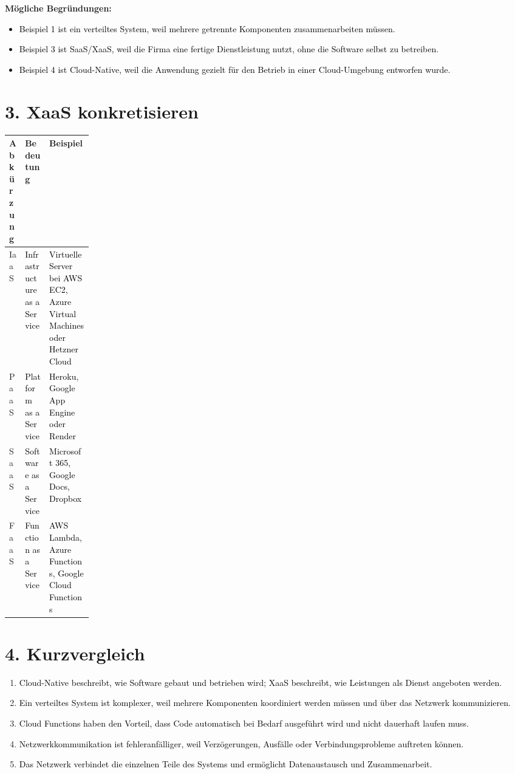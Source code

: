 \documentclass[11pt,a4paper]{article}
\newcommand{\solution}[1]{\textcolor{black}{#1}}
\begin{document}
\textbf{M\"ogliche Begr\"undungen:}
\begin{itemize}
  \item \solution{Beispiel 1 ist ein verteiltes System, weil mehrere getrennte Komponenten zusammenarbeiten m\"ussen.}
  \item \solution{Beispiel 3 ist SaaS/XaaS, weil die Firma eine fertige Dienstleistung nutzt, ohne die Software selbst zu betreiben.}
  \item \solution{Beispiel 4 ist Cloud-Native, weil die Anwendung gezielt f\"ur den Betrieb in einer Cloud-Umgebung entworfen wurde.}
\end{itemize}

\section*{3. XaaS konkretisieren}
\begin{tabularx}{\linewidth}{|>{\raggedright\arraybackslash}p{0.16\linewidth}|>{\raggedright\arraybackslash}X|>{\raggedright\arraybackslash}X|}
\hline
\textbf{Abk\"urzung} & \textbf{Bedeutung} & \textbf{Beispiel} \\
\hline
IaaS & \solution{Infrastructure as a Service} & \solution{Virtuelle Server bei AWS EC2, Azure Virtual Machines oder Hetzner Cloud} \\ \hline
PaaS & \solution{Platform as a Service} & \solution{Heroku, Google App Engine oder Render} \\ \hline
SaaS & \solution{Software as a Service} & \solution{Microsoft 365, Google Docs, Dropbox} \\ \hline
FaaS & \solution{Function as a Service} & \solution{AWS Lambda, Azure Functions, Google Cloud Functions} \\ \hline
\end{tabularx}

\section*{4. Kurzvergleich}
\begin{enumerate}
  \item \solution{Cloud-Native beschreibt, wie Software gebaut und betrieben wird; XaaS beschreibt, wie Leistungen als Dienst angeboten werden.}
  \item \solution{Ein verteiltes System ist komplexer, weil mehrere Komponenten koordiniert werden m\"ussen und \"uber das Netzwerk kommunizieren.}
  \item \solution{Cloud Functions haben den Vorteil, dass Code automatisch bei Bedarf ausgef\"uhrt wird und nicht dauerhaft laufen muss.}
  \item \solution{Netzwerkkommunikation ist fehleranf\"alliger, weil Verz\"ogerungen, Ausf\"alle oder Verbindungsprobleme auftreten k\"onnen.}
  \item \solution{Das Netzwerk verbindet die einzelnen Teile des Systems und erm\"oglicht Datenaustausch und Zusammenarbeit.}
\end{enumerate}
\end{document}
